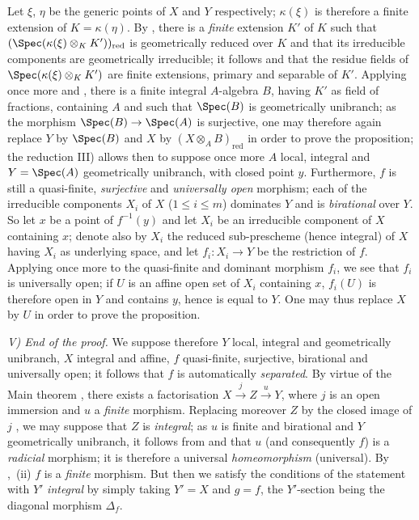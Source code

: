 Let $\xi$, $\eta$ be the generic points of $X$ and $Y$ respectively; $\kappa(\xi)$ is therefore a finite extension of $K=\kappa(\eta)$.
By , there is a \emph{finite} extension $K'$ of $K$ such that $(\Spec(\kappa(\xi)\otimes_K K'))_{\mathrm{red}}$ is geometrically reduced over $K$ and that its irreducible components are geometrically irreducible; it follows  and  that the residue fields of $\Spec(\kappa(\xi)\otimes_K K')$ are finite extensions, primary and separable of $K'$.
Applying once more  and , there is a finite integral $A$-algebra $B$, having $K'$ as field of fractions, containing $A$ and such that $\Spec(B)$ is geometrically unibranch; as the morphism $\Spec(B)\to\Spec(A)$ is surjective, one may therefore again replace $Y$ by $\Spec(B)$ and $X$ by $(X\otimes_A B)_{\mathrm{red}}$ in order to prove the proposition; the reduction III) allows then to suppose once more $A$ local, integral and $Y=\Spec(A)$ geometrically unibranch, with closed point $y$.
Furthermore, $f$ is still a quasi-finite, \emph{surjective} and \emph{universally open} morphism; each of the irreducible components $X_i$ of $X$ ($1\leq i\leq m$) dominates $Y$  and is \emph{birational} over $Y$.
So let $x$ be a point of $f^{-1}(y)$ and let $X_i$ be an irreducible component of $X$ containing $x$; denote also by $X_i$ the reduced sub-prescheme (hence integral) of $X$ having $X_i$ as underlying space, and let $f_i:X_i\to Y$ be the restriction of $f$.
Applying once more  to the quasi-finite and dominant morphism $f_i$, we see that $f_i$ is universally open; if $U$ is an affine open set of $X_i$ containing $x$, $f_i(U)$ is therefore
open in $Y$ and contains $y$, hence is equal to $Y$.
One may thus replace $X$ by $U$ in order to prove the proposition.

\emph{V) End of the proof.}
We suppose therefore $Y$ local, integral and geometrically unibranch, $X$ integral and affine, $f$ quasi-finite, surjective, birational and universally open; it follows that $f$ is automatically \emph{separated}.
By virtue of the Main theorem , there exists a factorisation $X\xrightarrow{j}Z\xrightarrow{u}Y$, where $j$ is an open immersion and $u$ a \emph{finite} morphism.
Replacing moreover $Z$ by the closed image of $j$ , we may suppose that $Z$ is \emph{integral}; as $u$ is finite and birational and $Y$ geometrically unibranch, it follows from  and  that $u$ (and consequently $f$) is a \emph{radicial} morphism; it is therefore a universal \emph{homeomorphism} (universal).
By ,~(ii) $f$ is a \emph{finite} morphism.
But then we satisfy the conditions of the statement with $Y'$ \emph{integral} by simply taking $Y'=X$ and $g=f$, the $Y'$-section being the diagonal morphism $\Delta_f$.

